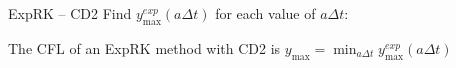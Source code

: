 \documentclass{beamer}
\begin{document}
\begin{frame}{ExpRK -- CD2}
  Find $y_\text{max}^{exp}(a\Delta t)$ for each value of $a\Delta t$:


  The CFL of an ExpRK method with CD2 is $y_\text{max}=\min_{a\Delta t}y_\text{max}^{exp}(a\Delta t)$
\end{frame}
\end{document}
